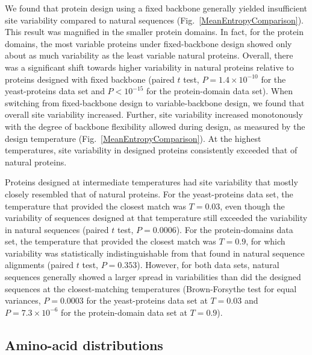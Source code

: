 \documentclass[12pt]{article}
\begin{document}
We found that protein design using a fixed backbone generally yielded insufficient site variability compared to natural sequences (Fig.~\ref{MeanEntropyComparison}).  This result was magnified in the smaller protein domains. In fact, for the protein domains, the most variable proteins under fixed-backbone design showed only about as much variability as the least variable natural proteins. Overall, there was a significant shift towards higher variability in natural proteins relative to proteins designed with fixed backbone (paired $t$ test, $P = 1.4\times10^{-10}$ for the yeast-proteins data set and $P<10^{-15}$ for the protein-domain data set). When switching from fixed-backbone design to variable-backbone design, we found that overall site variability increased. Further, site variability increased monotonously with the degree of backbone flexibility allowed during design, as measured by the design temperature (Fig.~\ref{MeanEntropyComparison}). At the highest temperatures, site variability in designed proteins consistently exceeded that of natural proteins. 

Proteins designed at intermediate temperatures had site variability that mostly closely resembled that of natural proteins. For the yeast-proteins data set, the temperature that provided the closest match was $T=0.03$, even though the variability of sequences designed at that temperature still exceeded the variability in natural sequences (paired $t$ test, $P= 0.0006$). For the protein-domains data set, the temperature that provided the closest match was $T=0.9$, for which variability was statistically indistinguishable from that found in natural sequence alignments (paired $t$ test, $P= 0.353$). However, for both data sets, natural sequences generally showed a larger spread in variabilities than did the designed sequences at the closest-matching temperatures (Brown-Forsythe test for equal variances, $P= 0.0003$ for the yeast-proteins data set at $T = 0.03$  and $P= 7.3\times 10^{-6}$ for the protein-domain data set at $T = 0.9$).

\subsection{Amino-acid distributions}
\label{AminoAcidDistributions}
\end{document}
